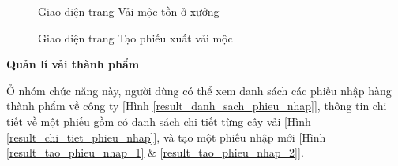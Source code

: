 \begin{figure}[H]
    \begin{center}
        \caption{Giao diện trang Vải mộc tồn ở xưởng}
        \label{result_moc_ton_xuong}
    \end{center}
\end{figure}

\begin{figure}[H]
    \begin{center}
        \caption{Giao diện trang Tạo phiếu xuất vải mộc}
        \label{result_tao_phieu_xuat}
    \end{center}
\end{figure}

\textbf{Quản lí vải thành phẩm}

Ở nhóm chức năng này, người dùng có thể xem danh sách các phiếu nhập hàng thành phẩm về công ty [Hình \ref{result_danh_sach_phieu_nhap}], thông tin chi tiết về một phiếu gồm có danh sách chi tiết từng cây vải [Hình \ref{result_chi_tiet_phieu_nhap}], và tạo một phiếu nhập mới [Hình \ref{result_tao_phieu_nhap_1} \& \ref{result_tao_phieu_nhap_2}].

